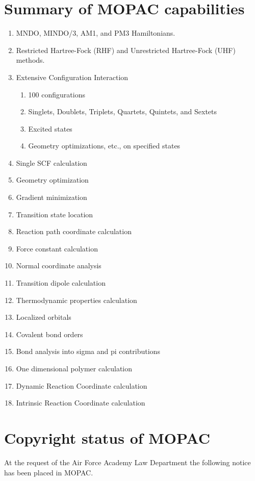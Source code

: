 \documentclass[a4paper]{book}
\newcommand{\mi}[1]{#1\index{#1}}
\begin{document}
\section{Summary of MOPAC capabilities}
\begin{enumerate}
\item MNDO, MINDO/3, AM1, and PM3 Hamiltonians.
\item Restricted  Hartree-Fock  (RHF)  and  Unrestricted  Hartree-Fock
      (UHF) methods.
\item Extensive Configuration Interaction
  \begin{enumerate}
     \item 100 configurations
     \item Singlets,  Doublets, Triplets, Quartets, Quintets, and Sextets
     \item Excited states
     \item Geometry optimizations, etc., on specified states
  \end{enumerate}
 \item Single SCF calculation
 \item Geometry optimization
 \item Gradient minimization
 \item Transition state location
 \item Reaction path coordinate calculation
 \item Force constant calculation
 \item Normal coordinate analysis
 \item Transition dipole calculation
 \item Thermodynamic properties calculation
 \item \mi{Localized orbitals}
 \item Covalent bond orders
 \item Bond analysis into sigma and pi contributions
 \item One dimensional polymer calculation
 \item Dynamic Reaction Coordinate calculation
 \item Intrinsic Reaction Coordinate calculation
\end{enumerate}

\section{Copyright status of MOPAC}
At the request of the Air Force Academy Law Department the following
notice has been placed in MOPAC.
\end{document}
